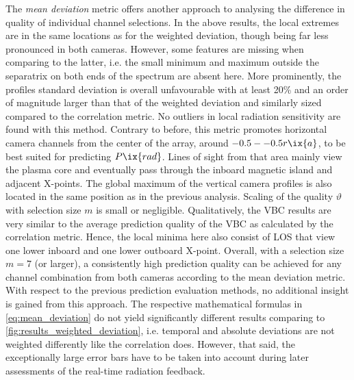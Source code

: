                 The \textit{mean deviation} metric offers another approach to analysing the difference in quality of individual channel selections. In the above results, the local extremes are in the same locations as for the weighted deviation, though being far less pronounced in both cameras. However, some features are missing when comparing to the latter, i.e. the small minimum and maximum outside the separatrix on both ends of the spectrum are absent here. More prominently, the profiles standard deviation is overall unfavourable with at least 20\% and an order of magnitude larger than that of the weighted deviation and similarly sized compared to the correlation metric. No outliers in local radiation sensitivity are found with this method. Contrary to before, this metric promotes horizontal camera channels from the center of the array, around $-0.5--0.5r\ix{a}$, to be best suited for predicting $P\ix{rad}$. Lines of sight from that area mainly view the plasma core and eventually pass through the inboard magnetic island and adjacent X-points. The global maximum of the vertical camera profiles is also located in the same position as in the previous analysis. Scaling of the quality $\vartheta$ with selection size $m$ is small or negligible. Qualitatively, the VBC results are very similar to the average prediction quality of the VBC as calculated by the correlation metric. Hence, the local minima here also consist of LOS that view one lower inboard and one lower outboard X-point. Overall, with a selection size $m=7$ (or larger), a consistently high prediction quality can be achieved for any channel combination from both cameras according to the mean deviation metric. With respect to the previous prediction evaluation methods, no additional insight is gained from this approach. The respective mathematical formulas in \cref{eq:mean_deviation} do not yield significantly different results comparing to \cref{fig:results_weighted_deviation}, i.e. temporal and absolute deviations are not weighted differently like the correlation does. However, that said, the exceptionally large error bars have to be taken into account during later assessments of the real-time radiation feedback.%
%

